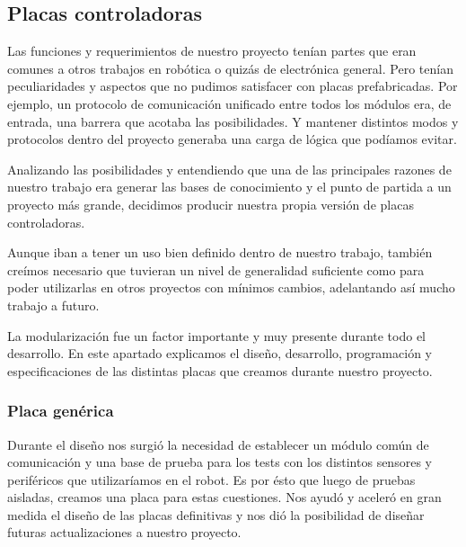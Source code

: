 % 

\subsection{Placas controladoras}
\label{h_placas}

Las funciones y requerimientos de nuestro proyecto ten\'ian partes que eran comunes a otros trabajos en rob\'otica o quiz\'as
de electr\'onica general.
Pero ten\'ian peculiaridades y aspectos que no pudimos satisfacer con placas prefabricadas.
Por ejemplo, un protocolo de comunicaci\'on unificado entre todos los m\'odulos era, de entrada, una barrera que acotaba
las posibilidades.
Y mantener distintos modos y protocolos dentro del proyecto generaba una carga de l\'ogica que pod\'iamos evitar.

Analizando las posibilidades y entendiendo que una de las principales razones de nuestro trabajo era generar las bases
de conocimiento y el punto de partida a un proyecto m\'as grande, decidimos producir nuestra propia versi\'on
de placas controladoras.

Aunque iban a tener un uso bien definido dentro de nuestro trabajo, tambi\'en cre\'imos necesario que tuvieran un nivel
de generalidad suficiente como para poder utilizarlas en otros proyectos con m\'inimos cambios, adelantando as\'i mucho
trabajo a futuro.

La modularizaci\'on fue un factor importante y muy presente durante todo el desarrollo.
En este apartado explicamos el dise\~no, desarrollo, programaci\'on y especificaciones de las distintas placas que creamos
durante nuestro proyecto.

\subsubsection{Placa gen\'erica}
\label{h_placas_generica}

Durante el dise\~no nos surgi\'o la necesidad de establecer un m\'odulo com\'un de comunicaci\'on y una base de prueba para
los tests con los distintos sensores y perif\'ericos que utilizar\'iamos en el robot.
Es por \'esto que luego de pruebas aisladas, creamos una placa para estas cuestiones.
Nos ayud\'o y aceler\'o en gran medida el dise\~no de las placas definitivas y nos di\'o la posibilidad de dise\~nar futuras
actualizaciones a nuestro proyecto.

